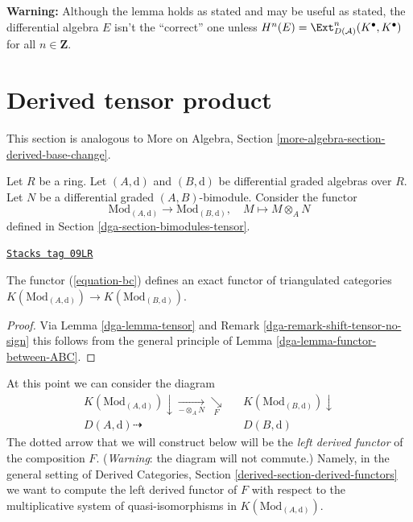 {\bf Warning:} Although the lemma holds as stated and may be useful
as stated, the differential algebra $E$ isn't the ``correct'' one unless
$H^n(E) = \Ext^n_{D(\mathcal{A})}(K^\bullet, K^\bullet)$
for all $n \in \mathbf{Z}$.

\section{Derived tensor product}
\label{dga-section-base-change}
This section is analogous to More on Algebra, Section
\ref{more-algebra-section-derived-base-change}.

\medskip\noindent
Let $R$ be a ring. Let $(A, \text{d})$ and $(B, \text{d})$ be
differential graded algebras over $R$. Let $N$ be a
differential graded $(A, B)$-bimodule. Consider the functor
\begin{equation}
\label{equation-bc}
\text{Mod}_{(A, \text{d})}
\longrightarrow
\text{Mod}_{(B, \text{d})},\quad
M \longmapsto M \otimes_A N
\end{equation}
defined in Section \ref{dga-section-bimodules-tensor}.

\begin{lemma}[Bc homotopy]
\label{dga-lemma-bc-homotopy}
\href{https://stacks.math.columbia.edu/tag/09LR}{\texttt{Stacks tag 09LR}}

The functor (\ref{equation-bc}) defines an exact functor
of triangulated categories
$K(\text{Mod}_{(A, \text{d})}) \to K(\text{Mod}_{(B, \text{d})})$.
\end{lemma}

\begin{proof}

Via Lemma \ref{dga-lemma-tensor} and
Remark \ref{dga-remark-shift-tensor-no-sign}
this follows from the general principle of
Lemma \ref{dga-lemma-functor-between-ABC}.
\end{proof}

At this point we can consider the diagram
$$
\begin{array}{ccc}K(\text{Mod}_{(A, \text{d})}) \downarrow\underset{- \otimes_A N}{\longrightarrow}\underset{F}{\searrow} &  & K(\text{Mod}_{(B, \text{d})}) \downarrow \\ D(A, \text{d}) \dashrightarrow &  & D(B, \text{d})\end{array}
$$
The dotted arrow that we will construct below will be the
{\it left derived functor} of the composition $F$.
({\it Warning}: the diagram will not commute.)
Namely, in the general setting of
Derived Categories, Section \ref{derived-section-derived-functors}
we want to compute the
left derived functor of $F$ with respect to the multiplicative system of
quasi-isomorphisms in $K(\text{Mod}_{(A, \text{d})})$.

